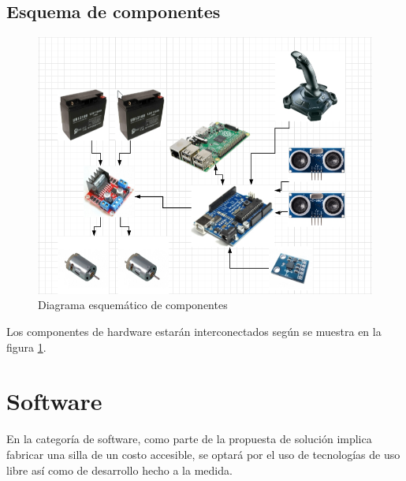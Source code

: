 \subsection{Esquema de componentes}

\begin{figure}[th]
    \centering
    \includegraphics[width=.9\textwidth]{Figures/components.png}
    \decoRule
    \caption{Diagrama esquem\'atico de componentes}
    \label{fig:components}
\end{figure}
Los componentes de hardware estar\'an interconectados seg\'un se muestra en la
figura \ref{fig:components}.

\section{Software}

En la categor\'ia de software, como parte de la propuesta de soluci\'on implica
fabricar una silla de un costo accesible, se optar\'a por el uso de
tecnolog\'ias de uso libre as\'i como de desarrollo hecho a la medida.\\

